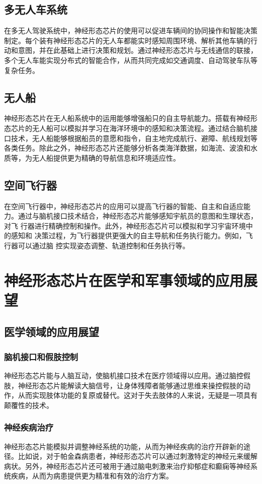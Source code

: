 \documentclass{thuemp}
\begin{document}
\subsection{多无人车系统}
在多无人驾驶系统中，神经形态芯片的使用可以促进车辆间的协同操作和智能决策制定。每个装有神经形态芯片的无人车都能实时感知周围环境、解析其他车辆的行动和意图，并在此基础上进行决策和规划。通过神经形态芯片与无线通信的联接，多个无人车能实现分布式的智能合作，从而共同完成如交通调度、自动驾驶车队等复杂任务。

\subsection{无人船}
神经形态芯片在无人船系统中的运用能够增强船只的自主导航能力。搭载有神经形态芯片的无人船可以模拟并学习在海洋环境中的感知和决策流程。通过结合脑机接口技术，无人船能够根据船员的意愿和指令，自主地完成航行、避障、航线规划等各类任务。除此之外，神经形态芯片还能够分析各类海洋数据，如海流、波浪和水质等，为无人船提供更为精确的导航信息和环境适应性。

\subsection{空间飞行器}
在空间飞行器中，神经形态芯片的应用可以提高飞行器的智能、自主和自适应能 力。通过与脑机接口技术结合，神经形态芯片能够感知宇航员的意图和生理状态，对飞 行器进行精确控制和操作。此外，神经形态芯片可以模拟和学习宇宙环境中的感知和 决策过程，为飞行器提供更强大的自主导航和任务执行能力。例如，飞行器可以通过脑 控实现姿态调整、轨道控制和任务执行等。

\section{神经形态芯片在医学和军事领域的应用展望}
\subsection{医学领域的应用展望}
\subsubsection{脑机接口和假肢控制}
神经形态芯片能与人脑互动，使脑机接口技术在医疗领域得以应用。通过脑控假肢，神经形态芯片能解读大脑信号，让身体残障者能够通过思维来操控假肢的动作，从而实现肢体功能的复原或替代。这对于失去肢体的人来说，无疑是一项具有颠覆性的技术。

\subsubsection{神经疾病治疗}
神经形态芯片能模拟并调整神经系统的功能，从而为神经疾病的治疗开辟新的途径。比如说，对于帕金森病患者，神经形态芯片可以通过刺激特定的神经元来缓解病状。另外，神经形态芯片还可被用于通过脑电刺激来治疗抑郁症和癫痫等神经系统疾病，从而为病患提供更为精准和有效的治疗方案。
\end{document}

